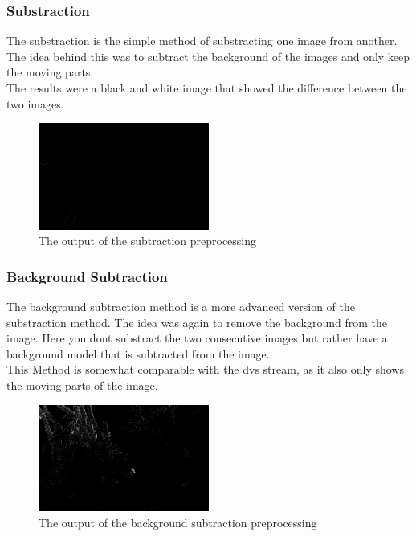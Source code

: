 \subsubsection{Substraction} 
The substraction is the simple method of substracting one image from another. The idea behind this was to subtract the background of the images and only keep the moving parts.\\
The results were a black and white image that showed the difference between the two images.

\begin{figure}[h]
    \centering
    \includegraphics[width=0.5\textwidth]{images/methods/img_002_002309_Sub.png}
    \caption{The output of the subtraction preprocessing}
\end{figure}

\subsubsection{Background Subtraction} 
The background subtraction method is a more advanced version of the substraction method. The idea was again to remove the background from the image. Here you dont substract the two consecutive images but rather have a background model that is subtracted from the image.\\
This Method is somewhat comparable with the dvs stream, as it also only shows the moving parts of the image.

\begin{figure}[h]
    \centering
    \includegraphics[width=0.5\textwidth]{images/methods/img_002_002309_BackSub.png}
    \caption{The output of the background subtraction preprocessing}
\end{figure}


